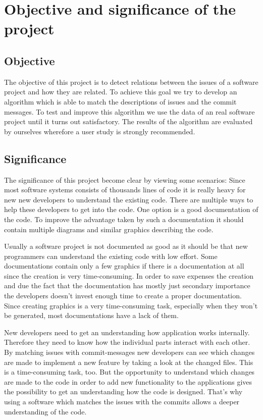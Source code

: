 \section{Objective and significance of the project}
\label{sec:objective}

\subsection{Objective}

The objective of this project is to detect relations between the issues of a software project and how they are related. To achieve this goal we try to develop an algorithm which is able to match the descriptions of issues and the commit messages. To test and improve this algorithm we use the data of an real software project until it turns out satisfactory. The results of the algorithm are evaluated by ourselves wherefore a user study is strongly recommended.

\subsection{Significance}
The significance of this project become clear by viewing some scenarios:
Since most software systems consists of thousands lines of code it is really heavy for new new developers to understand the existing code. There are multiple ways to help these developers to get into the code. One option is a good documentation of the code. To improve the advantage taken by such a documentation it should contain multiple diagrams and similar graphics describing the code.

Usually a software project is not documented as good as it should be that new programmers can understand the existing code with low effort. Some documentations contain only a few graphics if there is a documentation at all since the creation is very time-consuming. In order to save expenses the creation and due the fact that the documentation has mostly just secondary importance the developers doesn't invest enough time to create a proper documentation. Since creating graphics is a very time-consuming task, especially when they won't be generated, most documentations have a lack of them.

New developers need to get an understanding how application works internally. Therefore they need to know how the individual parts interact with each other. 
By matching issues with commit-messages new developers can see which changes are made to implement a new feature by taking a look at the changed files. This is a time-consuming task, too. But the opportunity to understand which changes are made to the code in order to add new functionality to the applications gives the possibility to get an understanding how the code is designed. That's why using a software which matches the issues with the commits allows a deeper understanding of the code.

